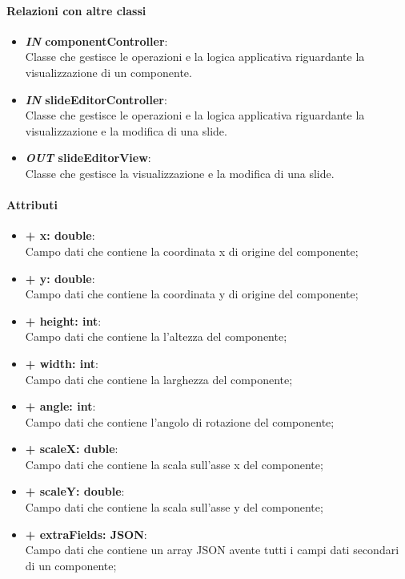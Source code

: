 	\paragraph{Relazioni con altre classi}
	\begin{itemize}
		\item \textbf{\textit{IN} componentController}:\\
		Classe che gestisce le operazioni e la logica applicativa riguardante la visualizzazione di un componente.
		\item \textbf{\textit{IN} slideEditorController}:\\
		Classe che gestisce le operazioni e la logica applicativa riguardante la visualizzazione e la modifica di una slide.
		\item \textbf{\textit{OUT} slideEditorView}:\\
		Classe che gestisce la visualizzazione e la modifica di una slide.
	\end{itemize}
	
	\paragraph{Attributi}
	\begin{itemize}
		\item \textbf{+ x: double}:\\
		Campo dati che contiene la coordinata x di origine del componente;
		\item \textbf{+ y: double}:\\
		Campo dati che contiene la coordinata y di origine del componente;
		\item \textbf{+ height: int}:\\
		Campo dati che contiene la l'altezza del componente;
		\item \textbf{+ width: int}:\\
		Campo dati che contiene la larghezza del componente;
		\item \textbf{+ angle: int}:\\
		Campo dati che contiene l'angolo di rotazione del componente;
		\item \textbf{+ scaleX: duble}:\\
		Campo dati che contiene la scala sull'asse x del componente;
		\item \textbf{+ scaleY: double}:\\
		Campo dati che contiene la scala sull'asse y del componente;
		\item \textbf{+ extraFields: JSON}:\\
		Campo dati che contiene un array JSON avente tutti i campi dati secondari di un componente;
	\end{itemize}


